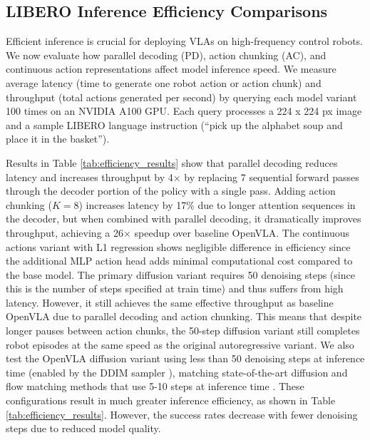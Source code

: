 \documentclass[conference]{IEEEtran}
\begin{document}
\subsection{LIBERO Inference Efficiency Comparisons}

Efficient inference is crucial for deploying VLAs on high-frequency control robots. We now evaluate how parallel decoding (PD), action chunking (AC), and continuous action representations affect model inference speed. We measure average latency (time to generate one robot action or action chunk) and throughput (total actions generated per second) by querying each model variant 100 times on an NVIDIA A100 GPU. Each query processes a 224 x 224 px image and a sample LIBERO language instruction (``pick up the alphabet soup and place it in the basket'').

Results in Table \ref{tab:efficiency_results} show that parallel decoding reduces latency and increases throughput by 4$\times$ by replacing 7 sequential forward passes through the decoder portion of the policy with a single pass. Adding action chunking ($K=8$) increases latency by 17\% due to longer attention sequences in the decoder, but when combined with parallel decoding, it dramatically improves throughput, achieving a 26$\times$ speedup over baseline OpenVLA. The continuous actions variant with L1 regression shows negligible difference in efficiency since the additional MLP action head adds minimal computational cost compared to the base model. The primary diffusion variant requires 50 denoising steps (since this is the number of steps specified at train time) and thus suffers from high latency. However, it still achieves the same effective throughput as baseline OpenVLA due to parallel decoding and action chunking. This means that despite longer pauses between action chunks, the 50-step diffusion variant still completes robot episodes at the same speed as the original autoregressive variant. We also test the OpenVLA diffusion variant using less than 50 denoising steps at inference time (enabled by the DDIM sampler \citep{song2020denoising}), matching state-of-the-art diffusion and flow matching methods that use 5-10 steps at inference time \citep{reuss2024multimodaldiffusiontransformerlearning, liu2024rdt, black2024pi_0}. These configurations result in much greater inference efficiency, as shown in Table \ref{tab:efficiency_results}. However, the success rates decrease with fewer denoising steps due to reduced model quality.
\end{document}
